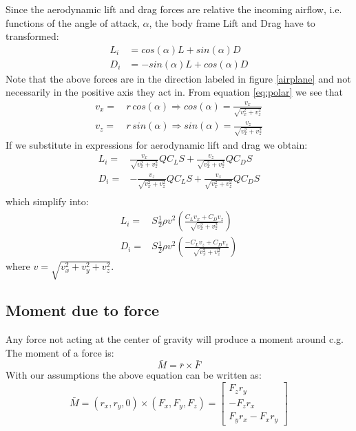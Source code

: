Since the aerodynamic lift and drag forces are relative the incoming airflow, i.e. functions of the angle of attack, $\alpha$, the body frame Lift and Drag have to transformed:
\begin{equation}\begin{split}
    L_i &= cos(\alpha) L + sin(\alpha) D \\
    D_i &= -sin(\alpha) L + cos(\alpha) D
    \label{LDbodyframe}
\end{split}\end{equation}
Note that the above forces are in the direction labeled in figure \ref{airplane} and not necessarily in the positive axis they act in.
From equation \ref{eq:polar} we see that
\begin{equation}\begin{split}
    v_x =& \, r \, cos(\alpha) \Rightarrow cos(\alpha) = \frac{v_x}{\sqrt{v_x^2 + v_z^2}} \\
    v_z =& \, r \, sin(\alpha) \Rightarrow sin(\alpha) = \frac{v_z}{\sqrt{v_x^2 + v_z^2}}
\end{split}\end{equation}
If we substitute in expressions for aerodynamic lift and drag we obtain:
\begin{equation}\begin{split}
    L_i =&  \frac{v_x}{\sqrt{v_x^2 + v_z^2}} Q C_L S +
            \frac{v_z}{\sqrt{v_x^2 + v_z^2}} Q C_D S \\
    D_i =& -\frac{v_z}{\sqrt{v_x^2 + v_z^2}} Q C_L S +
            \frac{v_x}{\sqrt{v_x^2 + v_z^2}} Q C_D S \\          
\end{split}\end{equation}
which simplify into:
\begin{equation}\begin{split}
    L_i =& 
     S \frac{1}{2} \rho v^2 \left( \frac{C_L v_x + C_D v_z}{\sqrt{v_x^2 + v_z^2}} \right) \\
    D_i =& 
     S \frac{1}{2} \rho v^2 \left( \frac{-C_L v_z + C_D v_x}{\sqrt{v_x^2 + v_z^2}} \right)
     \label{liftdragbody}
\end{split}\end{equation}
where $v = \sqrt{v_x^2 + v_y^2 + v_z^2}$.


\subsection{Moment due to force}

Any force not acting at the center of gravity will produce a moment around c.g.
The moment of a force is:
\begin{equation}
    \bar{M} = \bar{r} \times \bar{F}
\end{equation}
With our assumptions the above equation can be written as:
\begin{equation}
    \bar{M} = (r_x, r_y, 0) \times (F_x, F_y, F_z) = 
    \left[ \begin{matrix}
    F_z r_y \\
    -F_z r_x \\
    F_y r_x - F_x r_y \end{matrix} \right]
\end{equation}

